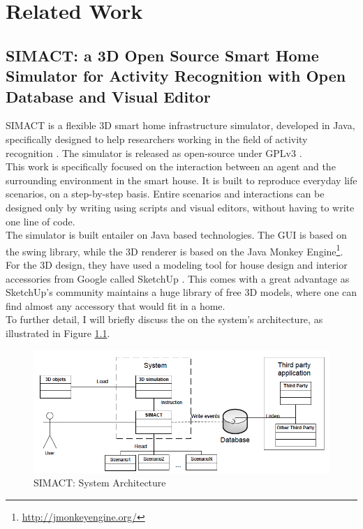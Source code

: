 \chapter{Related Work}\label{ch:related_work}

\section{SIMACT: a 3D Open Source Smart Home Simulator for Activity Recognition with Open Database and Visual Editor}\label{sec:simact}

SIMACT is a flexible 3D smart home infrastructure simulator, developed in Java, specifically designed to help researchers working in the field of activity recognition \cite{bouchard2012simact}. The simulator is released as open-source \cite{bouchard:simact:Online} under GPLv3 \cite{gpl:v3}.\\

This work is specifically focused on the interaction between an agent and the surrounding environment in the smart house. It is built to reproduce everyday life scenarios, on a step-by-step basis. Entire scenarios and interactions can be designed only by writing using scripts and visual editors, without having to write one line of code.\\

The simulator is built entailer on Java based technologies. The GUI is based on the swing library, while the 3D renderer is based on the Java Monkey Engine\footnote{\url{http://jmonkeyengine.org/}}. For the 3D design, they have used a modeling tool for house design and interior accessories from Google called SketchUp \cite{sketchup:online}. This comes with a great advantage as SketchUp's community maintains a huge library of free 3D models, where one can find almost any accessory that would fit in a home.\\

To further detail, I will briefly discuss the on the system's architecture, as illustrated in Figure \ref{fig:simact_architecture}.

\begin{figure}[H]
	\centering
	\includegraphics[width=\linewidth]{gfx/Chapter2/simact_architecture}
	\caption{SIMACT: System Architecture}
	\label{fig:simact_architecture}
\end{figure}

